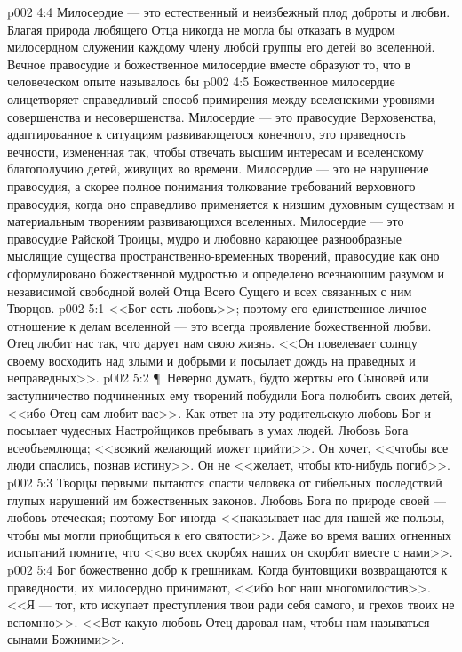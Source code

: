 \vs p002 4:4 Милосердие --- это естественный и неизбежный плод доброты и любви. Благая природа любящего Отца никогда не могла бы отказать в мудром милосердном служении каждому члену любой группы его детей во вселенной. Вечное правосудие и божественное милосердие вместе образуют то, что в человеческом опыте называлось бы 
\vs p002 4:5 Божественное милосердие олицетворяет справедливый способ примирения между вселенскими уровнями совершенства и несовершенства. Милосердие --- это правосудие Верховенства, адаптированное к ситуациям развивающегося конечного, это праведность вечности, измененная так, чтобы отвечать высшим интересам и вселенскому благополучию детей, живущих во времени. Милосердие --- это не нарушение правосудия, а скорее полное понимания толкование требований верховного правосудия, когда оно справедливо применяется к низшим духовным существам и материальным творениям развивающихся вселенных. Милосердие --- это правосудие Райской Троицы, мудро и любовно карающее разнообразные мыслящие существа пространственно\hyp{}временных творений, правосудие как оно сформулировано божественной мудростью и определено всезнающим разумом и независимой свободной волей Отца Всего Сущего и всех связанных с ним Творцов.
\vs p002 5:1 <<Бог есть любовь>>; поэтому его единственное личное отношение к делам вселенной --- это всегда проявление божественной любви. Отец любит нас так, что дарует нам свою жизнь. <<Он повелевает солнцу своему восходить над злыми и добрыми и посылает дождь на праведных и неправедных>>.
\vs p002 5:2 \P\ Неверно думать, будто жертвы его Сыновей или заступничество подчиненных ему творений побудили Бога полюбить своих детей, <<ибо Отец сам любит вас>>. Как ответ на эту родительскую любовь Бог и посылает чудесных Настройщиков пребывать в умах людей. Любовь Бога всеобъемлюща; <<всякий желающий может прийти>>. Он хочет, <<чтобы все люди спаслись, познав истину>>. Он не <<желает, чтобы кто\hyp{}нибудь погиб>>.
\vs p002 5:3 Творцы первыми пытаются спасти человека от гибельных последствий глупых нарушений им божественных законов. Любовь Бога по природе своей --- любовь отеческая; поэтому Бог иногда <<наказывает нас для нашей же пользы, чтобы мы могли приобщиться к его святости>>. Даже во время ваших огненных испытаний помните, что <<во всех скорбях наших он скорбит вместе с нами>>.
\vs p002 5:4 Бог божественно добр к грешникам. Когда бунтовщики возвращаются к праведности, их милосердно принимают, <<ибо Бог наш многомилостив>>. <<Я --- тот, кто искупает преступления твои ради себя самого, и грехов твоих не вспомню>>. <<Вот какую любовь Отец даровал нам, чтобы нам называться сынами Божиими>>.
